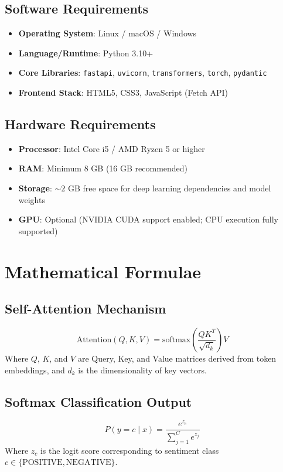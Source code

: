 \documentclass[12pt,a4paper]{article}
\begin{document}
\subsection{Software Requirements}
\begin{itemize}
    \item \textbf{Operating System}: Linux / macOS / Windows
    \item \textbf{Language/Runtime}: Python 3.10+
    \item \textbf{Core Libraries}: \texttt{fastapi}, \texttt{uvicorn}, \texttt{transformers}, \texttt{torch}, \texttt{pydantic}
    \item \textbf{Frontend Stack}: HTML5, CSS3, JavaScript (Fetch API)
\end{itemize}

\subsection{Hardware Requirements}
\begin{itemize}
    \item \textbf{Processor}: Intel Core i5 / AMD Ryzen 5 or higher
    \item \textbf{RAM}: Minimum 8 GB (16 GB recommended)
    \item \textbf{Storage}: $\sim 2$ GB free space for deep learning dependencies and model weights
    \item \textbf{GPU}: Optional (NVIDIA CUDA support enabled; CPU execution fully supported)
\end{itemize}

\section{Mathematical Formulae}
\subsection{Self-Attention Mechanism}
$$\text{Attention}(Q, K, V) = \text{softmax}\left(\frac{QK^T}{\sqrt{d_k}}\right)V$$
Where $Q$, $K$, and $V$ are Query, Key, and Value matrices derived from token embeddings, and $d_k$ is the dimensionality of key vectors.

\subsection{Softmax Classification Output}
$$P(y = c \mid x) = \frac{e^{z_c}}{\sum_{j=1}^{C} e^{z_j}}$$
Where $z_c$ is the logit score corresponding to sentiment class $c \in \{\text{POSITIVE}, \text{NEGATIVE}\}$.
\end{document}
